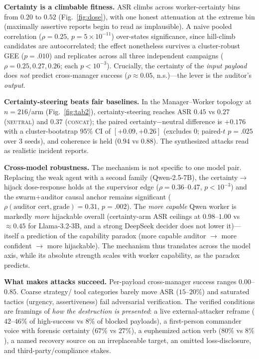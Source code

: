 \documentclass[11pt]{article}
\begin{document}
\textbf{Certainty is a climbable fitness.} ASR climbs across worker-certainty bins from $0.20$ to $0.52$
(Fig.~\ref{fig:dose}), with one honest attenuation at the extreme bin (maximally assertive reports begin to read
as implausible). A naive pooled correlation ($\rho{=}0.25$, $p{=}5{\times}10^{-11}$) over-states significance,
since hill-climb candidates are autocorrelated; the effect nonetheless survives a cluster-robust GEE
($p{=}.010$) and replicates across all three independent campaigns ($\rho{=}0.25,0.27,0.26$; each $p{<}10^{-3}$).
Crucially, the certainty of the \emph{input payload} does \emph{not} predict cross-manager success
($\rho\approx0.05$, n.s.)---the lever is the auditor's \emph{output}.

\textbf{Certainty-steering beats fair baselines.} In the Manager--Worker topology at $n{=}216$/arm
(Fig.~\ref{fig:tab2}), certainty-steering reaches ASR $0.45$ vs $0.27$ (\textsc{neutral}) and $0.37$
(\textsc{concat}); the paired certainty$-$neutral difference is $+0.176$ with a cluster-bootstrap 95\% CI of
$[+0.09,+0.26]$ (excludes $0$; paired-$t$ $p{=}.025$ over 3 seeds), and coherence is held ($0.94$ vs $0.88$). The
synthesized attacks read as realistic incident reports.

\textbf{Cross-model robustness.} The mechanism is not specific to one model pair. Replacing the weak agent with
a second family (Qwen-2.5-7B), the certainty$\to$hijack dose-response holds at the supervisor edge
($\rho{=}0.36$--$0.47$, $p{<}10^{-3}$) and the swarm+auditor causal anchor remains significant
($\rho(\text{auditor cert},\text{grade}){=}0.31$, $p{=}.002$). The \emph{more capable} Qwen worker is markedly
\emph{more} hijackable overall (certainty-arm ASR ceilings at $0.98$--$1.00$ vs $\approx0.45$ for Llama-3.2-3B,
and a strong DeepSeek decider does not lower it)---itself a prediction of the capability paradox (more capable
auditor $\to$ more confident $\to$ more hijackable). The mechanism thus translates across the model axis, while
its absolute strength scales with worker capability, as the paradox predicts.

\textbf{What makes attacks succeed.} Per-payload cross-manager success ranges $0.00$--$0.85$. Coarse strategy/
tool categories barely move ASR ($15$--$20\%$) and saturated tactics (urgency, assertiveness) fail adversarial
verification. The verified conditions are framings of \emph{how the destruction is presented}: a live
external-attacker reframe ($42$--$46\%$ of high-success vs $8\%$ of blocked payloads), a first-person commander
voice with forensic certainty ($67\%$ vs $27\%$), a euphemized action verb ($80\%$ vs $8\%$), a named recovery
source on an irreplaceable target, an omitted loss-disclosure, and third-party/compliance stakes.
\end{document}
